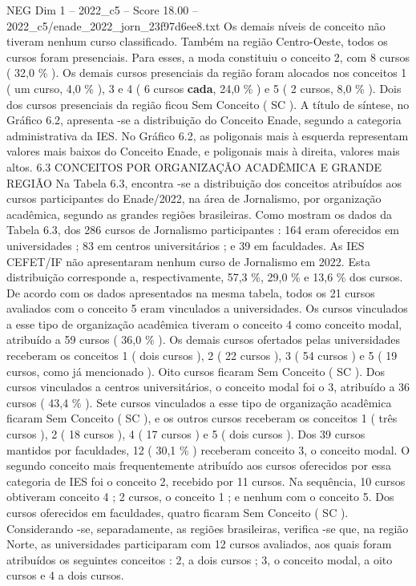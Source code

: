 \begin{textsample}{NEG Dim 1 – 2022\_c5 – Score 18.00 – 2022\_c5/enade\_2022\_jorn\_23f97d6ee8.txt}
Os demais níveis de conceito não tiveram nenhum curso classificado.
Também na região Centro-Oeste, todos os cursos foram presenciais.
Para esses, a moda constituiu o conceito 2, com 8 cursos ( 32,0 \% ).
Os demais cursos presenciais da região foram alocados nos conceitos 1 ( um curso, 4,0 \% ), 3 e 4 ( 6 cursos \textbf{cada}, 24,0 \% ) e 5 ( 2 cursos, 8,0 \% ).
Dois dos cursos presenciais da região ficou Sem Conceito ( SC ).
A título de síntese, no Gráfico 6.2, apresenta -se a distribuição do Conceito Enade, segundo a categoria administrativa da IES.
No Gráfico 6.2, as poligonais mais à esquerda representam valores mais baixos do Conceito Enade, e poligonais mais à direita, valores mais altos. 6.3 CONCEITOS POR ORGANIZAÇÃO ACADÊMICA E GRANDE REGIÃO Na Tabela 6.3, encontra -se a distribuição dos conceitos atribuídos aos cursos participantes do Enade/2022, na área de Jornalismo, por organização acadêmica, segundo as grandes regiões brasileiras.
Como mostram os dados da Tabela 6.3, dos 286 cursos de Jornalismo participantes : 164 eram oferecidos em universidades ; 83 em centros universitários ; e 39 em faculdades.
As IES CEFET/IF não apresentaram nenhum curso de Jornalismo em 2022.
Esta distribuição corresponde a, respectivamente, 57,3 \%, 29,0 \% e 13,6 \% dos cursos.
De acordo com os dados apresentados na mesma tabela, todos os 21 cursos avaliados com o conceito 5 eram vinculados a universidades.
Os cursos vinculados a esse tipo de organização acadêmica tiveram o conceito 4 como conceito modal, atribuído a 59 cursos ( 36,0 \% ).
Os demais cursos ofertados pelas universidades receberam os conceitos 1 ( dois cursos ), 2 ( 22 cursos ), 3 ( 54 cursos ) e 5 ( 19 cursos, como já mencionado ).
Oito cursos ficaram Sem Conceito ( SC ).
Dos cursos vinculados a centros universitários, o conceito modal foi o 3, atribuído a 36 cursos ( 43,4 \% ).
Sete cursos vinculados a esse tipo de organização acadêmica ficaram Sem Conceito ( SC ), e os outros cursos receberam os conceitos 1 ( três cursos ), 2 ( 18 cursos ), 4 ( 17 cursos ) e 5 ( dois cursos ).
Dos 39 cursos mantidos por faculdades, 12 ( 30,1 \% ) receberam conceito 3, o conceito modal.
O segundo conceito mais frequentemente atribuído aos cursos oferecidos por essa categoria de IES foi o conceito 2, recebido por 11 cursos.
Na sequência, 10 cursos obtiveram conceito 4 ; 2 cursos, o conceito 1 ; e nenhum com o conceito 5.
Dos cursos oferecidos em faculdades, quatro ficaram Sem Conceito ( SC ).
Considerando -se, separadamente, as regiões brasileiras, verifica -se que, na região Norte, as universidades participaram com 12 cursos avaliados, aos quais foram atribuídos os seguintes conceitos : 2, a dois cursos ; 3, o conceito modal, a oito cursos e 4 a dois cursos.

\end{textsample}
